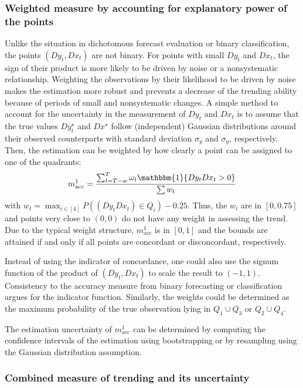 \documentclass[oneside]{article}
\theoremstyle{plain}%
\theoremstyle{definition}
\newcommand{\ind}[1]{\mathbbm{1}\{#1\}}
\newcommand{\ydiff}{D y}
\newcommand{\ydifft}{Dy^\star}
\newcommand{\xdiff}{Dx}
\newcommand{\xdifft}{Dx^\star}
\begin{document}
\subsubsection{Weighted measure by accounting for explanatory power of the points}\label{subsec:w1}

Unlike the situation in dichotomous forecast evaluation or binary classification, the points $(\ydiff_t, \xdiff_t)$ are not binary.
For points with small $\ydiff_t$ and $\xdiff_t$, the sign of their product is more likely to be driven by noise or a nonsystematic relationship.
Weighting the observations by their likelihood to be driven by noise makes the estimation more robust and prevents a decrease of the trending ability because of periods of small and nonsystematic changes. 
A simple method to account for the uncertainty in the measurement of $\ydiff_t$ and $\xdiff_t$ is to assume that the true values $\ydifft_t$ and $\xdifft$ follow (independent) Gaussian distributions around their observed counterparts with standard deviation $\sigma_y$ and $\sigma_y$, respectively.
Then, the estimation can be weighted by how clearly a point can be assigned to one of the quadrants:
\begin{equation}
    m_{\text{acc}}^1 = \frac{\sum_{t=T-w}^T \omega_t \ind{\ydiff_t \xdiff_t > 0} }{\sum w_t}
\end{equation}
with $w_t = \max_{i \in [4]} P((\ydiff_t \xdiff_t) \in Q_i) - 0.25$.
Thus, the $w_t$ are in $[0, 0.75]$ and points very close to $(0, 0)$ do not have any weight in assessing the trend. 
Due to the typical weight structure, $m_{\text{acc}}^1$ is in $[0,1]$ and the bounds are attained if and only if all points are concordant or disconcordant, respectively.

Instead of using the indicator of concordance, one could also use the signum function of the product of $(\ydiff_t, \xdiff_t)$ to scale the result to $(-1, 1)$.
Consistency to the accuracy measure from binary forecasting or classification argues for the indicator function.
Similarly, the weights could be determined as the maximum probability of the true observation lying in $Q_1 \cup Q_3$ or $Q_2 \cup Q_4$.

The estimation uncertainty of $m_{\text{acc}}^1$ can be determined by computing the confidence intervals of the estimation using bootstrapping or by resampling using the Gaussian distribution assumption.

\subsubsection{Combined measure of trending and its uncertainty} \label{subsec:w2}
\end{document}
